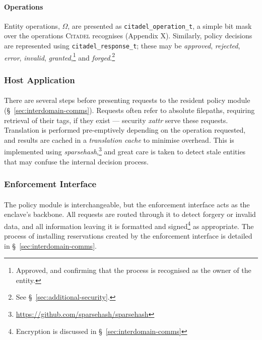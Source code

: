 \paragraph{Operations} Entity operations, $\Omega$, are presented as \texttt{citadel\_operation\_t}, a simple bit mask over the operations \textsc{Citadel} recognises (Appendix X). Similarly, policy decisions are represented using \texttt{citadel\_response\_t}; these may be \textit{approved}, \textit{rejected}, \textit{error}, \textit{invalid}, \textit{granted},\footnote{Approved, and confirming that the process is recognised as the owner of the entity.} and \textit{forged}.\footnote{See §~\ref{sec:additional-security}.}


\subsubsection{Host Application}

\paragraph{} There are several steps before presenting requests to the resident policy module (§~\ref{sec:interdomain-comms}). Requests often refer to absolute filepaths, requiring retrieval of their tags, if they exist --- security \textit{\acrshort{xattr}} serve these requests. Translation is performed pre-emptively depending on the operation requested, and results are cached in a \textit{translation cache} to minimise overhead. This is implemented using \textit{sparsehash},\footnote{\url{https://github.com/sparsehash/sparsehash}} and great care is taken to detect stale entities that may confuse the internal decision process.


\subsubsection{Enforcement Interface}
\paragraph{} The policy module is interchangeable, but the enforcement interface acts as the enclave's backbone. All requests are routed through it to detect forgery or invalid data, and all information leaving it is formatted and signed\footnote{Encryption is discussed in §~\ref{sec:interdomain-comms}} as appropriate. The process of installing reservations created by the enforcement interface is detailed in §~\ref{sec:interdomain-comms}.

